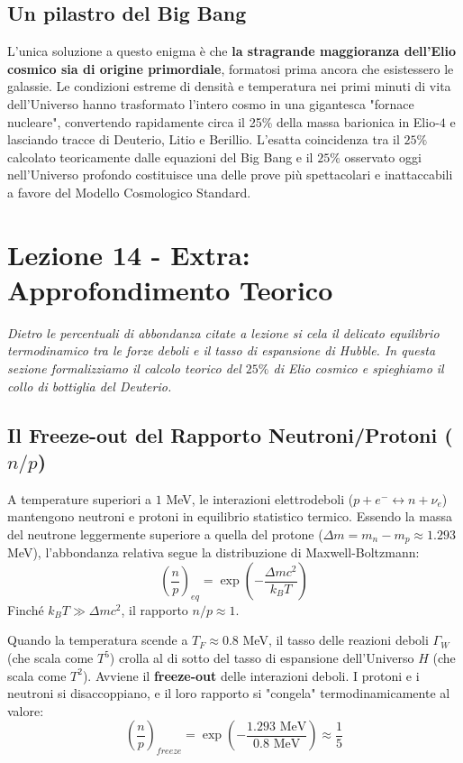 \documentclass[11pt,a4paper]{report}
\begin{document}
\subsection{Un pilastro del Big Bang}
L'unica soluzione a questo enigma è che \textbf{la stragrande maggioranza dell'Elio cosmico sia di origine primordiale}, formatosi prima ancora che esistessero le galassie. 
Le condizioni estreme di densità e temperatura nei primi minuti di vita dell'Universo hanno trasformato l'intero cosmo in una gigantesca "fornace nucleare", convertendo rapidamente circa il 25\% della massa barionica in Elio-$4$ e lasciando tracce di Deuterio, Litio e Berillio. L'esatta coincidenza tra il $25\%$ calcolato teoricamente dalle equazioni del Big Bang e il $25\%$ osservato oggi nell'Universo profondo costituisce una delle prove più spettacolari e inattaccabili a favore del Modello Cosmologico Standard.


\newpage
\section{Lezione 14 - Extra: Approfondimento Teorico}

\textit{Dietro le percentuali di abbondanza citate a lezione si cela il delicato equilibrio termodinamico tra le forze deboli e il tasso di espansione di Hubble. In questa sezione formalizziamo il calcolo teorico del $25\%$ di Elio cosmico e spieghiamo il collo di bottiglia del Deuterio.}

\subsection{Il Freeze-out del Rapporto Neutroni/Protoni ($n/p$)}
A temperature superiori a $1$ MeV, le interazioni elettrodeboli ($p + e^- \leftrightarrow n + \nu_e$) mantengono neutroni e protoni in equilibrio statistico termico. Essendo la massa del neutrone leggermente superiore a quella del protone ($\Delta m = m_n - m_p \approx 1.293$ MeV), l'abbondanza relativa segue la distribuzione di Maxwell-Boltzmann:
\begin{equation}
\left( \frac{n}{p} \right)_{eq} = \exp\left( -\frac{\Delta m c^2}{k_B T} \right)
\end{equation}
Finché $k_B T \gg \Delta m c^2$, il rapporto $n/p \approx 1$. 

Quando la temperatura scende a $T_F \approx 0.8$ MeV, il tasso delle reazioni deboli $\Gamma_W$ (che scala come $T^5$) crolla al di sotto del tasso di espansione dell'Universo $H$ (che scala come $T^2$). Avviene il \textbf{freeze-out} delle interazioni deboli. I protoni e i neutroni si disaccoppiano, e il loro rapporto si "congela" termodinamicamente al valore:
\begin{equation}
\left( \frac{n}{p} \right)_{freeze} = \exp\left( -\frac{1.293 \text{ MeV}}{0.8 \text{ MeV}} \right) \approx \frac{1}{5}
\end{equation}
\end{document}
